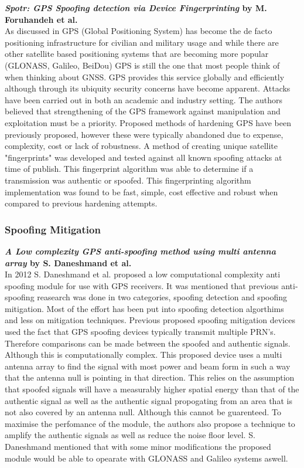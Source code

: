 \textbf{\emph{Spotr: GPS Spoofing detection via Device Fingerprinting} by M. Foruhandeh et al.}\\
As discussed in \cite{RN7} GPS (Global Positioning System) has become the de facto positioning infrastructure for civilian and 
military usage and while there are other satellite based positioning systems that are becoming more popular (GLONASS, Galileo, BeiDou) GPS is 
still the one that most people think of when thinking about GNSS. GPS provides this service globally and efficiently although through its ubiquity
security concerns have become apparent. Attacks have been carried out in both an academic and industry setting.
The authors believed that strengthening of the GPS framework against manipulation and exploitation must be a priority.
Proposed methods of hardening GPS have been previously proposed, however these were typically abandoned due to expense, complexity, cost or lack of robustness. 
A method of creating unique satellite "fingerprints" was developed and tested against all known spoofing attacks at time of publish.
This fingerprint algorithm was able to determine if a transmission was authentic or spoofed.
This fingerprinting algorithm implementation was found to be fast, simple, cost effective and robust when compared to previous hardening attempts.  

\medskip
\subsubsection{Spoofing Mitigation}

\textbf{\emph{A Low complexity GPS anti-spoofing method using multi antenna array} by S. Daneshmand et al.} \\
In 2012 S. Daneshmand et al. \cite{RN8} proposed a low computational complexity anti spoofing module for use with GPS receivers.
It was mentioned that previous anti-spoofing reasearch was done in two categories, spoofing detection and spoofing mitigation.
Most of the effort has been put into spoofing detection algorthims and less on mitigation techniques. 
Previous proposed spoofing mitigation devices used the fact that GPS spoofing devices typically transmit multiple PRN's. 
Therefore comparisons can be made between the spoofed and authentic signals. Although this is computationally complex. This proposed
device uses a multi antenna array to find the signal with most power and beam form in such a way that the antenna null is pointing in
that direction. This relies on the assumption that spoofed signals will have a measurably higher spatial energy than that of the authentic signal
as well as the authentic signal propogating from an area that is not also covered by an antenna null. Although this cannot be guarenteed.
To maximise the perfomance of the module, the authors also propose a technique to amplify the authentic signals as well as reduce the noise floor level.
S. Daneshmand mentioned that with some minor modifications the proposed module would be able to opearate with GLONASS and Galileo systems aswell. 

